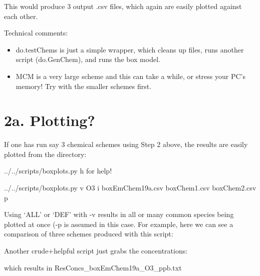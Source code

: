 \documentclass[a4paper,10pt,english]{sphinxmanual}
\begin{document}
This would produce 3 output .csv files, which again are easily plotted
against each other.

Technical comments:
\begin{itemize}
\item {} 
do.testChems is just a simple wrapper, which cleans up files, runs another script (do.GenChem), and runs the box model.

\item {} 
MCM is a very large scheme and this can take a while, or stress your PC’s memory! Try with the smaller schemes first.

\end{itemize}


\section{2a. Plotting?}
\label{\detokenize{GenChemDoc_quickstart:a-plotting}}
If one has run say 3 chemical schemes using Step 2 above, the results
are easily plotted from the  directory:

\begin{sphinxVerbatim}[commandchars=\\\{\}]
../../scripts/boxplots.py \PYGZhy{}h     for help!

../../scripts/boxplots.py \PYGZhy{}v O3 \PYGZhy{}i boxEmChem19a.csv boxChem1.csv boxChem2.csv  \PYGZhy{}p
\end{sphinxVerbatim}

Using ‘ALL’ or ‘DEF’ with -v results in all or many common species being plotted at once (-p is assumed
in this case. For example, here we can see a comparison of three schemes produced with this script:


Another crude+helpful script just grabs the concentrations:

\begin{sphinxVerbatim}[commandchars=\\\{\}]
   
\end{sphinxVerbatim}

which results in ResConcs\_boxEmChem19a\_O3\_ppb.txt
\end{document}

